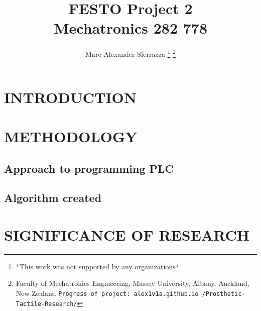 \documentclass[a4paper, 10pt, conference]{article}
\title{\LARGE \bf
FESTO Project 2\\Mechatronics 282 778
}
\author{Marc Alexander Sferrazza%
\thanks{*This work was not supported by any organization}%
\thanks{Faculty of Mechatronics Engineering, Massey University, Albany, Auckland, New Zealand
        {\tt\small Progress of project: alex1v1a.github.io /Prosthetic-Tactile-Research/}}%
}
\begin{document}
\maketitle
\thispagestyle{empty}
\pagestyle{empty}



\begin{abstract}



\end{abstract}


\tableofcontents




\section{INTRODUCTION}



\section{METHODOLOGY}




\subsection{Approach to programming PLC}



\subsection{Algorithm created}




\section{SIGNIFICANCE OF RESEARCH}
\end{document}
